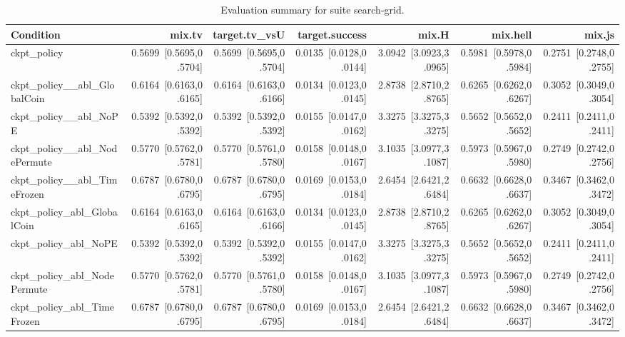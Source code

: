 \begin{table}[t]
\centering
\caption{Evaluation summary for suite search-grid.}
\label{tab:eval_search-grid}
\begin{tabular}{lrrrrrr}
\toprule
Condition & mix.tv & target.tv\_vsU & target.success & mix.H & mix.hell & mix.js \\
\midrule
ckpt\_policy & 0.5699~[0.5695,0.5704] & 0.5699~[0.5695,0.5704] & 0.0135~[0.0128,0.0144] & 3.0942~[3.0923,3.0965] & 0.5981~[0.5978,0.5984] & 0.2751~[0.2748,0.2755] \\
ckpt\_policy\_\_abl\_GlobalCoin & 0.6164~[0.6163,0.6165] & 0.6164~[0.6163,0.6166] & 0.0134~[0.0123,0.0145] & 2.8738~[2.8710,2.8765] & 0.6265~[0.6262,0.6267] & 0.3052~[0.3049,0.3054] \\
ckpt\_policy\_\_abl\_NoPE & 0.5392~[0.5392,0.5392] & 0.5392~[0.5392,0.5392] & 0.0155~[0.0147,0.0162] & 3.3275~[3.3275,3.3275] & 0.5652~[0.5652,0.5652] & 0.2411~[0.2411,0.2411] \\
ckpt\_policy\_\_abl\_NodePermute & 0.5770~[0.5762,0.5781] & 0.5770~[0.5761,0.5780] & 0.0158~[0.0148,0.0167] & 3.1035~[3.0977,3.1087] & 0.5973~[0.5967,0.5980] & 0.2749~[0.2742,0.2756] \\
ckpt\_policy\_\_abl\_TimeFrozen & 0.6787~[0.6780,0.6795] & 0.6787~[0.6780,0.6795] & 0.0169~[0.0153,0.0184] & 2.6454~[2.6421,2.6484] & 0.6632~[0.6628,0.6637] & 0.3467~[0.3462,0.3472] \\
ckpt\_policy\_abl\_GlobalCoin & 0.6164~[0.6163,0.6165] & 0.6164~[0.6163,0.6166] & 0.0134~[0.0123,0.0145] & 2.8738~[2.8710,2.8765] & 0.6265~[0.6262,0.6267] & 0.3052~[0.3049,0.3054] \\
ckpt\_policy\_abl\_NoPE & 0.5392~[0.5392,0.5392] & 0.5392~[0.5392,0.5392] & 0.0155~[0.0147,0.0162] & 3.3275~[3.3275,3.3275] & 0.5652~[0.5652,0.5652] & 0.2411~[0.2411,0.2411] \\
ckpt\_policy\_abl\_NodePermute & 0.5770~[0.5762,0.5781] & 0.5770~[0.5761,0.5780] & 0.0158~[0.0148,0.0167] & 3.1035~[3.0977,3.1087] & 0.5973~[0.5967,0.5980] & 0.2749~[0.2742,0.2756] \\
ckpt\_policy\_abl\_TimeFrozen & 0.6787~[0.6780,0.6795] & 0.6787~[0.6780,0.6795] & 0.0169~[0.0153,0.0184] & 2.6454~[2.6421,2.6484] & 0.6632~[0.6628,0.6637] & 0.3467~[0.3462,0.3472] \\
\bottomrule
\end{tabular}
\end{table}

